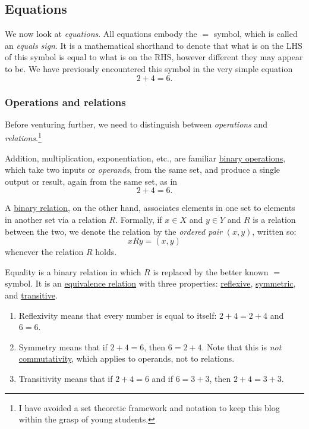 \documentclass[
  a4paper,
]{article}
\providecommand{\tightlist}{%
  \setlength{\itemsep}{0pt}\setlength{\parskip}{0pt}}
\begin{document}
\subsection{Equations}\label{equations}

We now look at \emph{equations}. All equations embody the \(=\) symbol,
which is called an \emph{equals sign}. It is a mathematical shorthand to
denote that what is on the LHS of this symbol is equal to what is on the
RHS, however different they may appear to be. We have previously
encountered this symbol in the very simple equation \[
2 + 4 = 6.
\]

\subsubsection{Operations and relations}\label{operations-and-relations}

Before venturing further, we need to distinguish between
\emph{operations} and \emph{relations}.\footnote{I have avoided a set
  theoretic framework and notation to keep this blog within the grasp of
  young students.}

Addition, multiplication, exponentiation, etc., are familiar
\href{https://en.wikipedia.org/wiki/Binary_operation}{binary
operations}, which take two inputs or \emph{operands}, from the same
set, and produce a single output or result, again from the same set, as
in \[
2 + 4 = 6.
\]

A \href{https://en.wikipedia.org/wiki/Binary_relation}{binary relation},
on the other hand, associates elements in one set to elements in another
set via a relation \(R\). Formally, if \(x \in X\) and \(y \in Y\) and
\(R\) is a relation between the two, we denote the relation by the
\emph{ordered pair} \((x, y)\), written so: \[
xRy = (x, y)
\] whenever the relation \(R\) holds.

Equality is a binary relation in which \(R\) is replaced by the better
known \(=\) symbol. It is an
\href{https://en.wikipedia.org/wiki/Equivalence_relation}{equivalence
relation} with three properties:
\href{https://en.wikipedia.org/wiki/Reflexive_relatio}{reflexive},
\href{https://en.wikipedia.org/wiki/Symmetric_relation}{symmetric}, and
\href{https://en.wikipedia.org/wiki/Transitive_relation}{transitive}.

\begin{enumerate}
\tightlist
\item
  Reflexivity means that every number is equal to itself:
  \(2 + 4 = 2 + 4\) and \(6 = 6\).
\item
  Symmetry means that if \(2 + 4 = 6\), then \(6 = 2 + 4\). Note that
  this is \emph{not}
  \href{https://en.wikipedia.org/wiki/Commutative_property}{commutativity},
  which applies to operands, not to relations.
\item
  Transitivity means that if \(2 + 4 = 6\) and if \(6 = 3 + 3\), then
  \(2 + 4 = 3 + 3\).
\end{enumerate}
\end{document}
